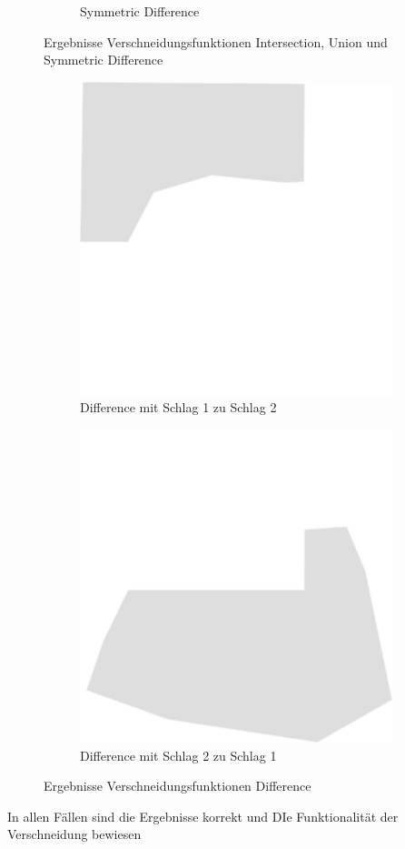 \begin{figure}[h!]
\begin{subfigure}{.3\textwidth}
  \caption{Symmetric Difference}
  \label{fig:sub3}
\end{subfigure}
\caption{Ergebnisse Verschneidungsfunktionen Intersection, Union und Symmetric Difference}
\label{fig:intersects1}
\end{figure}
\begin{figure}[h!]
\centering
\begin{subfigure}{.5\textwidth}
  \centering
  \includegraphics[width=.7\linewidth]{Abbildungen/st_difference1.png}
  \caption{Difference mit Schlag 1 zu Schlag 2}
  \label{fig:sub4}
\end{subfigure}%
\begin{subfigure}{.5\textwidth}
  \centering
  \includegraphics[width=.7\linewidth]{Abbildungen/st_difference2.png}
  \caption{Difference mit Schlag 2 zu Schlag 1}
  \label{fig:sub5}
\end{subfigure}
\caption{Ergebnisse Verschneidungsfunktionen Difference}
\label{fig:intersects2}
\end{figure}
In allen Fällen sind die Ergebnisse korrekt und DIe Funktionalität der Verschneidung bewiesen

